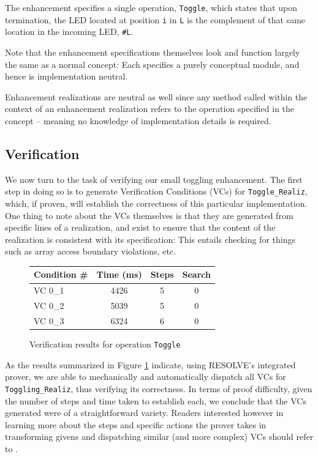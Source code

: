\documentclass{sig-alternate}
\begin{document}
The enhancement specifies a single operation, \texttt{Toggle}, which states that upon termination, the LED located at position \texttt{i} in \texttt{L} is the complement of that same location in the incoming LED, \texttt{\#L}.

Note that the enhancement specifications themselves look and function largely the same as a normal concept: Each specifies a purely conceptual module, and hence is implementation neutral. 

Enhancement realizations are neutral as well since any method called within the context of an enhancement realization refers to the operation specified in the concept -- meaning no knowledge of implementation details is required.

\subsection{Verification}

We now turn to the task of verifying our small toggling enhancement. The first step in doing so is to generate Verification Conditions (VCs) for \texttt{Toggle\_Realiz}, which, if proven, will establish the correctness of this particular implementation. One thing to note about the VCs themselves is that they are generated from specific lines of a realization, and exist to ensure that the content of the realization is consistent with its specification: This entails checking for things such as array access boundary violations, etc.  

\begin{figure}[!htb]
\centering
\begin{tabular}{lccc}
	\toprule
	Condition \# & Time (ms)	& Steps	& Search \\
	\midrule
	VC 0\_1	& 4426	& 5	& 0	\\
	VC 0\_2	& 5039	& 5	& 0	\\
	VC 0\_3	& 6324	& 6	& 0	\\
	\bottomrule
\end{tabular}
\caption{Verification results for operation \texttt{Toggle}}
\label{fig:results}
\end{figure}

As the results summarized in Figure \ref{fig:results} indicate, using RESOLVE's integrated prover, we are able to mechanically and automatically dispatch all VCs for \texttt{Toggling\_Realiz}, thus verifying its correctness. In terms of proof difficulty, given the number of steps and time taken to establish each, we conclude that the VCs generated were of a straightforward variety. Readers interested however in learning more about the steps and specific actions the prover takes in transforming givens and dispatching similar (and more complex) VCs should refer to \cite{smith:2013}.
\end{document}
